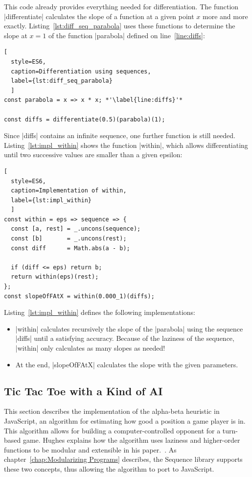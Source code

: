 This code already provides everything needed for differentiation. The function
|differentiate| calculates the slope of a function at a given point $x$ more
and more exactly.
Listing~\ref{lst:diff_seq_parabola} uses these functions to determine the 
slope at $x = 1$ of the function |parabola| defined on line~\ref{line:diffs}:

\begin{lstlisting}[
  style=ES6, 
  caption=Differentiation using sequences,
  label={lst:diff_seq_parabola}
  ]
const parabola = x => x * x; *'\label{line:diffs}'*

const diffs = differentiate(0.5)(parabola)(1);
\end{lstlisting}

Since |diffs| contains an infinite sequence, one further
function is still needed.
Listing~\ref{lst:impl_within} shows the function |within|, which allows
differentiating until two successive values are smaller than a given epsilon:

\begin{lstlisting}[
  style=ES6, 
  caption=Implementation of within,
  label={lst:impl_within}
  ]
const within = eps => sequence => {
  const [a, rest] = _.uncons(sequence);
  const [b]       = _.uncons(rest);
  const diff      = Math.abs(a - b);

  if (diff <= eps) return b;
  return within(eps)(rest);
};
const slopeOfFAtX = within(0.000_1)(diffs);
\end{lstlisting}

Listing~\ref{lst:impl_within} defines the following implementations:

\begin{itemize}
  \item |within| calculates recursively the slope of the |parabola| using the
    sequence |diffs| until a satisfying accuracy. Because of the laziness of
    the sequence, |within| only calculates as many slopes as needed!
  \item At the end, |slopeOfFAtX| calculates the slope with the given parameters.
\end{itemize}


\subsection{Tic Tac Toe with a Kind of AI}
\label{sub:Alpha - Beta Algorithm}
This section describes the implementation of the alpha-beta heuristic in
JavaScript, an algorithm for estimating how good a position a game player is
in. \\ 
This algorithm allows for building a computer-controlled opponent for a
turn-based game. Hughes explains how the algorithm uses laziness and
higher-order functions to be modular and extensible in his paper.~\cite[p.
16]{hughes_why_1989}. As chapter~\ref{chap:Modularizing Programs} describes, the
Sequence library supports these two concepts, thus allowing the algorithm to 
port to JavaScript.

